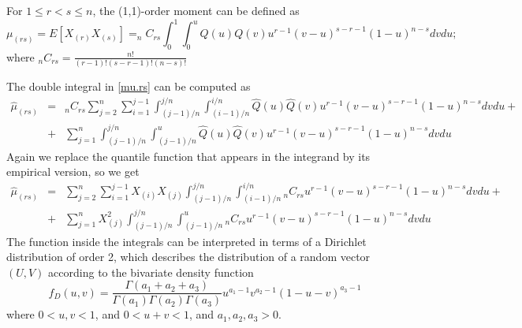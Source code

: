 \documentclass[preprint,12pt]{elsarticle}
\begin{document}
For $1 \leq r < s \leq n$, the (1,1)-order moment can be defined as 
\begin{equation}\label{mu.rs}
\mu_{(rs)}=E\left[X_{(r)}X_{(s)}\right]= _nC_{rs} \int_0^1\int_0^{u} Q(u)Q(v) u^{r-1}(v-u)^{s-r-1}(1-u)^{n-s}dvdu;
\end{equation}
where $_nC_{rs}=\frac{n!}{(r-1)!(s-r-1)!(n-s)!}$

The double integral in \eqref{mu.rs} can be computed as
\begin{eqnarray}\label{mu.rs.hat1}
\nonumber \widehat{\mu}_{(rs)}&=&_nC_{rs}\sum_{j=2}^n \sum_{i=1}^{j-1}\int_{(j-1)/n}^{j/n}\int_{(i-1)/n}^{i/n} \widehat{Q}(u)\widehat{Q}(v) u^{r-1}(v-u)^{s-r-1}(1-u)^{n-s}dvdu +\\
&+& \sum_{j=1}^n \int_{(j-1)/n}^{j/n}\int_{(j-1)/n}^{u} \widehat{Q}(u)\widehat{Q}(v) u^{r-1}(v-u)^{s-r-1}(1-u)^{n-s}dvdu 
\end{eqnarray}
Again we replace the quantile function that appears in the integrand by its empirical version, so we get 
\begin{eqnarray}\label{mu.rs.hat2}
\nonumber \widehat{\mu}_{(rs)}&=&\sum_{j=2}^n \sum_{i=1}^{j-1} X_{(i)}X_{(j)}\int_{(j-1)/n}^{j/n}\int_{(i-1)/n}^{i/n} {_n}C_{rs} u^{r-1}(v-u)^{s-r-1}(1-u)^{n-s} dv du +\\
 &+& \sum_{j=1}^n X_{(j)}^2\int_{(j-1)/n}^{j/n}\int_{(j-1)/n}^{u} {_n}C_{rs} u^{r-1}(v-u)^{s-r-1}(1-u)^{n-s}dvdu 
\end{eqnarray}
The function inside the integrals can be interpreted in terms  of a Dirichlet distribution of order 2, which describes the distribution of a random vector $(U,V)$ according to the  bivariate density function
\begin{equation}\label{diri}
f_D(u,v)=\frac{\Gamma(a_1+a_2+a_3)}{\Gamma(a_1)\Gamma(a_2)\Gamma(a_3)}u^{a_1-1}v^{a_2-1}(1-u-v)^{a_3-1}
\end{equation}
where $0<u,v<1$, and $0<u+v<1$, and $a_1, a_2, a_3 >0$.
\end{document}
